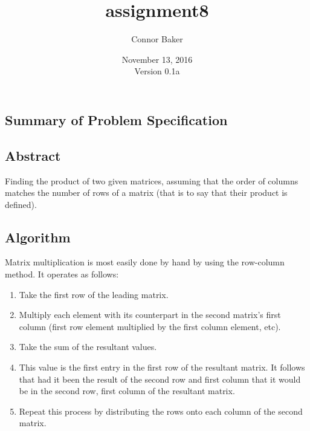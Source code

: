 \documentclass[12pt]{article}
\begin{document}
\null
\nointerlineskip 
\vfill
\let \snewpage \newpage
\let \newpage \relax
    \title{assignment8}
    \author{Connor Baker}
    \date{November 13, 2016\\Version 0.1a}
\maketitle
\let \newpage \snewpage
\vfill
\thispagestyle{empty}



\newpage %



\makeatletter
{}
\renewcommand*\l@section{\@dottedtocline{1}{0em}{1.5em}}
\makeatother
\tableofcontents

\clearpage
{}

\begin{center}
\section{Summary of Problem Specification}
\end{center}
\subsection{Abstract}
Finding the product of two given matrices, assuming that the order of columns matches the number of rows of a matrix (that is to say that their product is defined).
\subsection{Algorithm}
Matrix multiplication is most easily done by hand by using the row-column method. It operates as follows:
\begin{enumerate}
\item Take the first row of the leading matrix.
\item Multiply each element with its counterpart in the second matrix's first column (first row element multiplied by the first column element, etc).
\item Take the sum of the resultant values.
\item This value is the first entry in the first row of the resultant matrix.
\subitem It follows that had it been the result of the second row and first column that it would be in the second row, first column of the resultant matrix.
\item Repeat this process by distributing the rows onto each column of the second matrix.
\end{enumerate}
\end{document}
